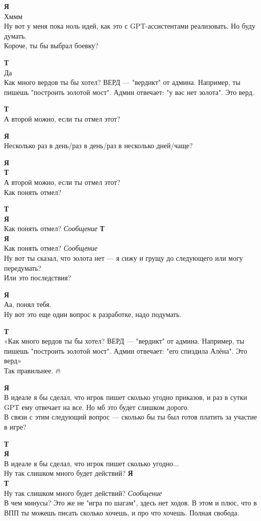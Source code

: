 \begin{tabbing}
\textbf{Я} \\
Хммм \\
Ну вот у меня пока ноль идей, как это с GPT-ассистентами реализовать. Но буду думать. \\
Короче, ты бы выбрал боевку?

\textbf{Т} \\
Да \\
Как много вердов ты бы хотел? ВЕРД — "вердикт" от админа. Например, ты пишешь "построить золотой мост". Админ отвечает: "у вас нет золота". Это верд.

\textbf{Т} \\
А второй можно, если ты отмел этот?

\textbf{Я} \\
Несколько раз в день/раз в день/раз в несколько дней/чаще?

\textbf{Я} \\
\textbf{Т} \\
А второй можно, если ты отмел этот? \\
Как понять отмел?

\textbf{Т} \\
\textbf{Я} \\
Как понять отмел? \textit{Сообщение}
\textbf{Т} \\
\textbf{Я} \\
Как понять отмел? \textit{Сообщение} \\
Ну вот ты сказал, что золота нет — я сижу и грущу до следующего или могу передумать? \\
Или это последствия?

\textbf{Я} \\
Аа, понял тебя. \\
Ну вот это еще один вопрос к разработке, надо подумать.

\textbf{Т} \\
«Как много вердов ты бы хотел? ВЕРД — "вердикт" от админа. Например, ты пишешь "построить золотой мост". Админ отвечает: "его спиздила Алёна". Это верд» \\
Так правильнее. 🔥🦔

\textbf{Я} \\
В идеале я бы сделал, что игрок пишет сколько угодно приказов, и раз в сутки GPT ему отвечает на все. Но мб это будет слишком дорого. \\
В связи с этим следующий вопрос — сколько бы ты был готов платить за участие в игре?

\textbf{Т} \\
\textbf{Я} \\
В идеале я бы сделал, что игрок пишет сколько угодно... \\
Ну так слишком много будет действий?
\textbf{Я} \\
\textbf{Т} \\
Ну так слишком много будет действий? \textit{Сообщение} \\
В чем минусы? Это же не "игра по шагам", здесь нет ходов. В этом и плюс, что в ВПП ты можешь писать сколько хочешь, и про что хочешь. Полная свобода.


\end{tabbing}
